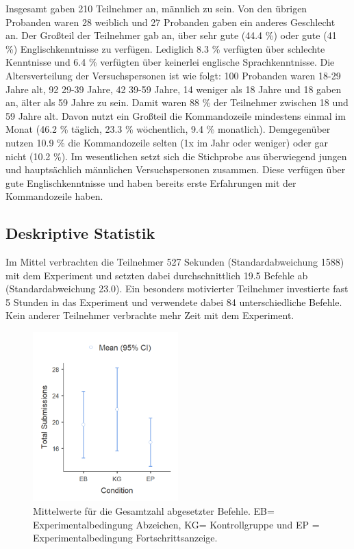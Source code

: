 Insgesamt gaben 210 Teilnehmer an, männlich zu sein. Von den übrigen Probanden waren 28 weiblich und 27 Probanden gaben ein anderes Geschlecht an. Der Großteil der Teilnehmer gab an, über sehr gute (44.4 \%) oder gute (41 \%) Englischkenntnisse zu verfügen. Lediglich 8.3 \% verfügten über schlechte Kenntnisse und 6.4 \% verfügten über keinerlei englische Sprachkenntnisse. Die Altersverteilung der Versuchspersonen ist wie folgt: 100 Probanden waren 18-29 Jahre alt, 92  29-39 Jahre,  42 39-59 Jahre, 14 weniger als 18 Jahre und 18 gaben an, älter als 59 Jahre zu sein. Damit waren 88 \% der Teilnehmer zwischen 18 und 59 Jahre alt. Davon nutzt ein Großteil die Kommandozeile mindestens einmal im Monat (46.2 \% täglich, 23.3 \% wöchentlich, 9.4 \% monatlich). Demgegenüber nutzen 10.9 \% die Kommandozeile selten (1x im Jahr oder weniger) oder gar nicht (10.2 \%). Im wesentlichen setzt sich die Stichprobe aus überwiegend jungen und hauptsächlich männlichen Versuchspersonen zusammen. Diese verfügen über gute Englischkenntnisse und haben bereits erste Erfahrungen mit der Kommandozeile haben.

\subsection{Deskriptive Statistik}
Im Mittel verbrachten die Teilnehmer 527 Sekunden (Standardabweichung 1588) mit dem Experiment und setzten dabei durchschnittlich 19.5 Befehle ab (Standardabweichung 23.0). Ein besonders motivierter Teilnehmer investierte fast 5 Stunden in das Experiment und verwendete dabei 84 unterschiedliche Befehle. Kein anderer Teilnehmer verbrachte mehr Zeit mit dem Experiment.

\begin{figure}[htbp]
    \centering
    \includegraphics[width=0.5\textwidth]{img/auswertung/mean_subs.png}
    \caption{Mittelwerte für die Gesamtzahl abgesetzter Befehle. EB= Experimentalbedingung Abzeichen, KG= Kontrollgruppe und EP = Experimentalbedingung Fortschrittsanzeige.}
    \label{mean_subs}
\end{figure}

